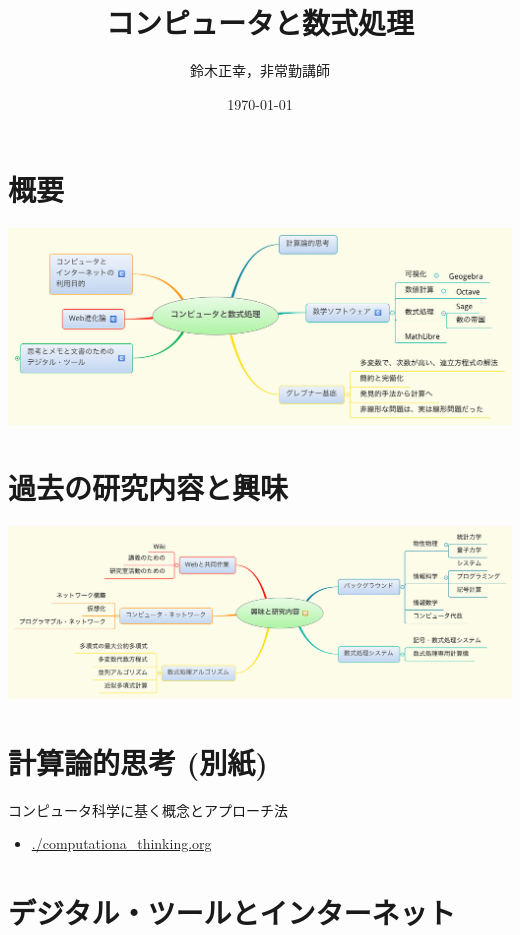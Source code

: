 \documentclass[dvipdfmx,11pt]{jarticle}
\author{鈴木正幸，非常勤講師}
\date{\today}
\title{コンピュータと数式処理}
\begin{document}
\maketitle

\section{概要}
\label{sec:orge857d94}
\begin{center}
\includegraphics[width=.9\linewidth]{./map-images/01-computer_and_cal.png}
\end{center}

\section{過去の研究内容と興味}
\label{sec:orgf3da361}
\begin{center}
\includegraphics[width=.9\linewidth]{./map-images/02-research_interests.png}
\end{center}

\section{計算論的思考 (別紙)}
\label{sec:org09cca8b}

コンピュータ科学に基く概念とアプローチ法

\begin{itemize}
\item \url{./computationa\_thinking.org}
\end{itemize}


\section{デジタル・ツールとインターネット}
\label{sec:orgb8d1f2e}
\end{document}

